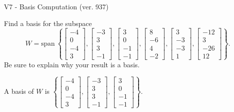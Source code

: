 \begin{exercise}
  \begin{exerciseTitle}V7 - Basis Computation (ver. 937)\end{exerciseTitle}
  \begin{exerciseStatement}
    Find a basis for the subspace 
\[W=\mathrm{span}\ \left\{\left[\begin{array}{r}
-4 \\
0 \\
-4 \\
3
\end{array}\right] , \left[\begin{array}{r}
-3 \\
3 \\
3 \\
-1
\end{array}\right] , \left[\begin{array}{r}
3 \\
0 \\
-1 \\
-1
\end{array}\right] , \left[\begin{array}{r}
8 \\
-6 \\
4 \\
-2
\end{array}\right] , \left[\begin{array}{r}
3 \\
-3 \\
-3 \\
1
\end{array}\right] , \left[\begin{array}{r}
-12 \\
3 \\
-26 \\
12
\end{array}\right]\right\}.\]
 Be sure to explain why your result is a basis.


  \end{exerciseStatement}
  \begin{exerciseAnswer}
   A basis of \(W\) is  \(\left\{\left[\begin{array}{r}
-4 \\
0 \\
-4 \\
3
\end{array}\right] , \left[\begin{array}{r}
-3 \\
3 \\
3 \\
-1
\end{array}\right] , \left[\begin{array}{r}
3 \\
0 \\
-1 \\
-1
\end{array}\right]\right\}\).
  


  \end{exerciseAnswer}
\end{exercise}